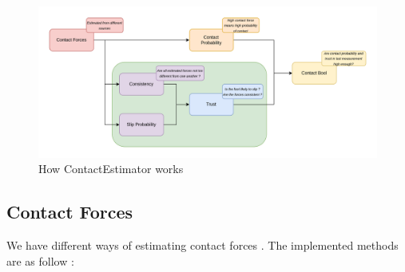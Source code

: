\documentclass[a4paper,10pt]{article}
\begin{document}
\begin{figure}[H]
\centering
  \includegraphics[width=\linewidth, angle=0, scale=1.2]{./images/Logique_ContactEstimator.png}
  \caption{How ContactEstimator works}
\end{figure}




\subsection{Contact Forces}
We have different ways of estimating contact forces \cite{6}\cite{10}\cite{14}. The implemented methods are as follow :
\end{document}
